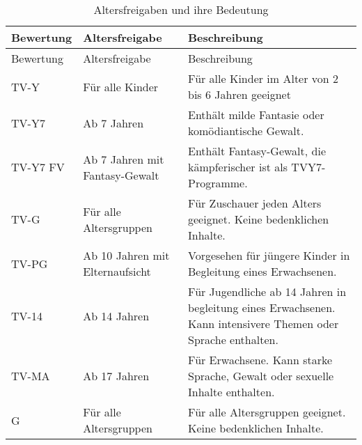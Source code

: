 \documentclass[
]{article}
\begin{document}
\begin{longtable}[]{@{}
  >{\raggedright\arraybackslash}p{}
  >{\centering\arraybackslash}p{}
  >{\raggedright\arraybackslash}p{}@{}}
\caption{Altersfreigaben und ihre Bedeutung}\tabularnewline
\toprule\noalign{}
\begin{minipage}[b]{\linewidth}\raggedright
Bewertung
\end{minipage} & \begin{minipage}[b]{\linewidth}\centering
Altersfreigabe
\end{minipage} & \begin{minipage}[b]{\linewidth}\raggedright
Beschreibung
\end{minipage} \\
\midrule\noalign{}
\endfirsthead
\toprule\noalign{}
\begin{minipage}[b]{\linewidth}\raggedright
Bewertung
\end{minipage} & \begin{minipage}[b]{\linewidth}\centering
Altersfreigabe
\end{minipage} & \begin{minipage}[b]{\linewidth}\raggedright
Beschreibung
\end{minipage} \\
\midrule\noalign{}
\endhead
\bottomrule\noalign{}
\endlastfoot
TV-Y & Für alle Kinder & Für alle Kinder im Alter von 2 bis 6 Jahren
geeignet \\
TV-Y7 & Ab 7 Jahren & Enthält milde Fantasie oder komödiantische
Gewalt. \\
TV-Y7 FV & Ab 7 Jahren mit Fantasy-Gewalt & Enthält Fantasy-Gewalt, die
kämpferischer ist als TVY7-Programme. \\
TV-G & Für alle Altersgruppen & Für Zuschauer jeden Alters geeignet.
Keine bedenklichen Inhalte. \\
TV-PG & Ab 10 Jahren mit Elternaufsicht & Vorgesehen für jüngere Kinder
in Begleitung eines Erwachsenen. \\
TV-14 & Ab 14 Jahren & Für Jugendliche ab 14 Jahren in begleitung eines
Erwachsenen. Kann intensivere Themen oder Sprache enthalten. \\
TV-MA & Ab 17 Jahren & Für Erwachsene. Kann starke Sprache, Gewalt oder
sexuelle Inhalte enthalten. \\
G & Für alle Altersgruppen & Für alle Altersgruppen geeignet. Keine
bedenklichen Inhalte. \\

\end{longtable}
\end{document}
